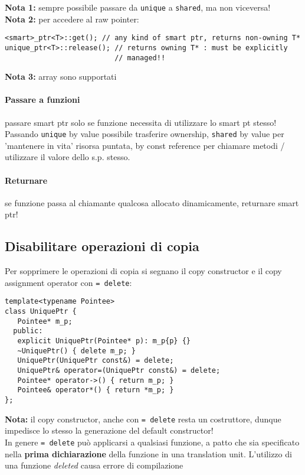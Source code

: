 \documentclass[10pt, oneside]{Book}
\begin{document}
\textbf{Nota 1: }sempre possibile passare da \texttt{unique} a \texttt{shared}, ma non viceversa!
\\\textbf{Nota 2:} per accedere al raw pointer:
\begin{verbatim}
<smart>_ptr<T>::get(); // any kind of smart ptr, returns non-owning T*
unique_ptr<T>::release(); // returns owning T* : must be explicitly
                          // managed!!
\end{verbatim}
\textbf{Nota 3:} array sono supportati
\paragraph{Passare a funzioni} passare smart ptr solo se funzione necessita di utilizzare lo smart pt stesso! Passando \texttt{unique} by value possibile trasferire ownership, \texttt{shared} by value per 'mantenere in vita' risorsa puntata, by const reference per chiamare metodi / utilizzare il valore dello s.p. stesso.
\paragraph{Returnare} se funzione passa al chiamante qualcosa allocato dinamicamente, returnare smart ptr!

\subsection{Disabilitare operazioni di copia}
Per sopprimere le operazioni di copia si segnano il copy constructor e il copy assignment operator con \texttt{= delete}:
\begin{verbatim}
template<typename Pointee>
class UniquePtr {
   Pointee* m_p;
  public:
   explicit UniquePtr(Pointee* p): m_p{p} {}
   ~UniquePtr() { delete m_p; }
   UniquePtr(UniquePtr const&) = delete;
   UniquePtr& operator=(UniquePtr const&) = delete;
   Pointee* operator->() { return m_p; }
   Pointee& operator*() { return *m_p; }
};
\end{verbatim}
\textbf{Nota:} il copy constructor, anche con \texttt{= delete} resta un costruttore, dunque impedisce lo stesso la generazione del default constructor!
\\In genere \texttt{= delete} può applicarsi a qualsiasi funzione, a patto che sia specificato nella \textbf{prima dichiarazione} della funzione in una translation unit. L'utilizzo di una funzione \textit{deleted} causa errore di compilazione
\end{document}
